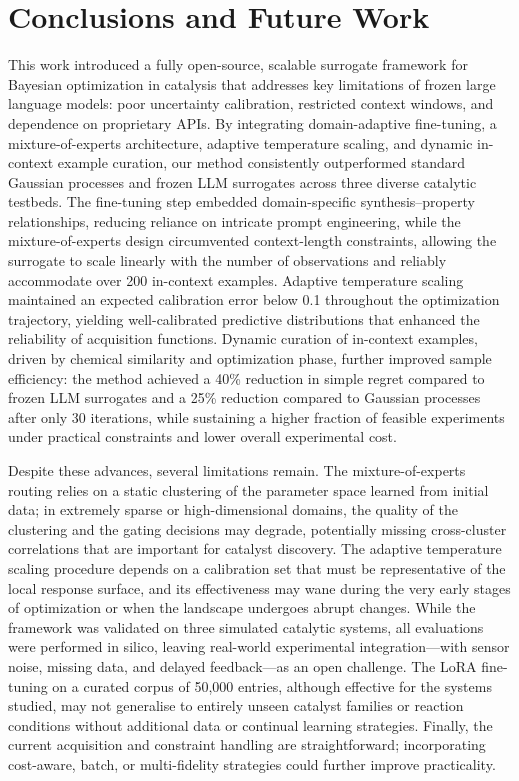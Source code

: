 \documentclass{article}
\begin{document}
\section{Conclusions and Future Work}

This work introduced a fully open-source, scalable surrogate framework for Bayesian optimization in catalysis that addresses key limitations of frozen large language models: poor uncertainty calibration, restricted context windows, and dependence on proprietary APIs. By integrating domain-adaptive fine-tuning, a mixture-of-experts architecture, adaptive temperature scaling, and dynamic in-context example curation, our method consistently outperformed standard Gaussian processes and frozen LLM surrogates across three diverse catalytic testbeds. The fine-tuning step embedded domain-specific synthesis–property relationships, reducing reliance on intricate prompt engineering, while the mixture-of-experts design circumvented context-length constraints, allowing the surrogate to scale linearly with the number of observations and reliably accommodate over 200 in-context examples. Adaptive temperature scaling maintained an expected calibration error below 0.1 throughout the optimization trajectory, yielding well-calibrated predictive distributions that enhanced the reliability of acquisition functions. Dynamic curation of in-context examples, driven by chemical similarity and optimization phase, further improved sample efficiency: the method achieved a 40\% reduction in simple regret compared to frozen LLM surrogates and a 25\% reduction compared to Gaussian processes after only 30 iterations, while sustaining a higher fraction of feasible experiments under practical constraints and lower overall experimental cost.

Despite these advances, several limitations remain. The mixture-of-experts routing relies on a static clustering of the parameter space learned from initial data; in extremely sparse or high-dimensional domains, the quality of the clustering and the gating decisions may degrade, potentially missing cross-cluster correlations that are important for catalyst discovery. The adaptive temperature scaling procedure depends on a calibration set that must be representative of the local response surface, and its effectiveness may wane during the very early stages of optimization or when the landscape undergoes abrupt changes. While the framework was validated on three simulated catalytic systems, all evaluations were performed in silico, leaving real-world experimental integration—with sensor noise, missing data, and delayed feedback—as an open challenge. The LoRA fine-tuning on a curated corpus of 50,000 entries, although effective for the systems studied, may not generalise to entirely unseen catalyst families or reaction conditions without additional data or continual learning strategies. Finally, the current acquisition and constraint handling are straightforward; incorporating cost-aware, batch, or multi-fidelity strategies could further improve practicality.
\end{document}
